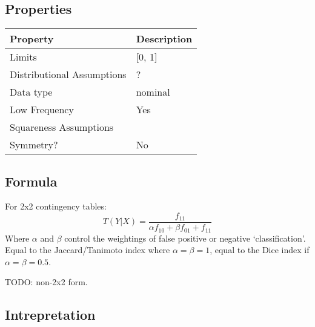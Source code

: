 \documentclass[11pt]{article}
\begin{document}
\subsection{Properties}
\begin{tabular}{| l || l |}
    \hline
    {\bf Property} & {\bf Description} \\
    \hline
    Limits & [0, 1] \\ \hline

    Distributional Assumptions& ? \\ \hline

    Data type & nominal \\ \hline

    Low Frequency & Yes \\ \hline

    Squareness Assumptions &  \\ \hline
    
    Symmetry? & No \\ \hline

\end{tabular}


\subsection{Formula}
For 2x2 contingency tables:
$$
T(Y|X) = \frac{ f_{11} }{ \alpha f_{10} + \beta f_{01} + f_{11} }
$$
Where $\alpha$ and $\beta$ control the weightings of false positive or negative `classification'.  Equal to the Jaccard/Tanimoto index where $\alpha = \beta = 1$, equal to the Dice index if $\alpha = \beta = 0.5$.

TODO: non-2x2 form.

\subsection{Intrepretation}
\end{document}
